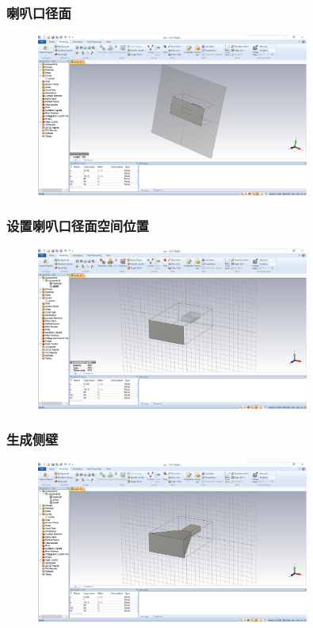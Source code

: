 \documentclass{../source/zjureport}
\begin{document}
            \subsubsection{喇叭口径面}
            \begin{figure}[thp]
                \centering
                \includegraphics[width = 0.8\textwidth]{figure/创建面.png}
            \end{figure}
            \newpage
            \subsubsection{设置喇叭口径面空间位置}
            \begin{figure}[thp]
                \centering
                \includegraphics[width = 0.8\textwidth]{figure/平移后.png}
            \end{figure}
            \subsubsection{生成侧壁}
            \begin{figure}[thp]
                \centering
                \includegraphics[width = 0.8\textwidth]{figure/喇叭外观.png}
            \end{figure}
            \newpage
\end{document}
